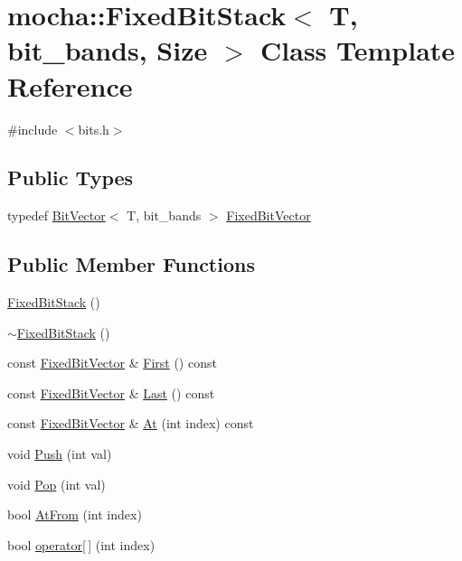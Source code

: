 \hypertarget{classmocha_1_1_fixed_bit_stack}{
\section{mocha::FixedBitStack$<$ T, bit\_\-bands, Size $>$ Class Template Reference}
\label{classmocha_1_1_fixed_bit_stack}
}


{\ttfamily \#include $<$bits.h$>$}

\subsection*{Public Types}
\begin{DoxyCompactItemize}
\item 
typedef \hyperlink{classmocha_1_1_bit_vector}{BitVector}$<$ T, bit\_\-bands $>$ \hyperlink{classmocha_1_1_fixed_bit_stack_aee038548c8d6aac4c6dd319f83f2b9d7}{FixedBitVector}
\end{DoxyCompactItemize}
\subsection*{Public Member Functions}
\begin{DoxyCompactItemize}
\item 
\hyperlink{classmocha_1_1_fixed_bit_stack_aa000a1e50e76779d0ef2b9761f8139f6}{FixedBitStack} ()
\item 
\hyperlink{classmocha_1_1_fixed_bit_stack_a87e772bc39e36859e916f345a5a2bc8d}{$\sim$FixedBitStack} ()
\item 
const \hyperlink{classmocha_1_1_bit_vector}{FixedBitVector} \& \hyperlink{classmocha_1_1_fixed_bit_stack_a0c65bab398ca0ab638a454e74caa8d56}{First} () const 
\item 
const \hyperlink{classmocha_1_1_bit_vector}{FixedBitVector} \& \hyperlink{classmocha_1_1_fixed_bit_stack_aa0d321cd87c73b1c335c7235c589aa06}{Last} () const 
\item 
const \hyperlink{classmocha_1_1_bit_vector}{FixedBitVector} \& \hyperlink{classmocha_1_1_fixed_bit_stack_a39829e596e57c27f1ca2657d6537a211}{At} (int index) const 
\item 
void \hyperlink{classmocha_1_1_fixed_bit_stack_a51bea702f00243271d3172e0409c20ff}{Push} (int val)
\item 
void \hyperlink{classmocha_1_1_fixed_bit_stack_a34ff857142078b4d9d782ddcfad06d7c}{Pop} (int val)
\item 
bool \hyperlink{classmocha_1_1_fixed_bit_stack_a153c07be728fdbf2c3ccbf0755a862f9}{AtFrom} (int index)
\item 
bool \hyperlink{classmocha_1_1_fixed_bit_stack_aa245b95a1f1e1aa88000bab24a407f82}{operator\mbox{[}$\,$\mbox{]}} (int index)
\end{DoxyCompactItemize}
